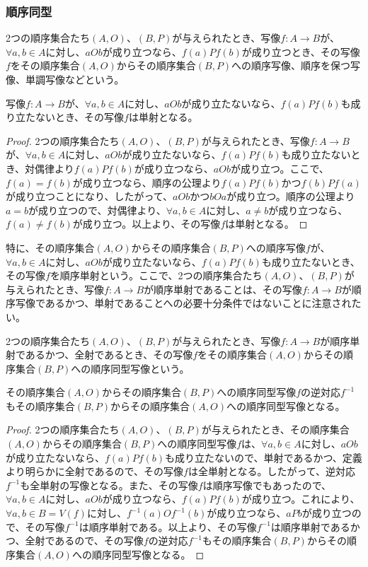 \documentclass[dvipdfmx]{jsarticle}
\begin{document}
\subsubsection{順序同型}%
\begin{dfn}
2つの順序集合たち$(A,O)$、$(B,P)$が与えられたとき、写像$f:A \rightarrow B$が、$\forall a,b \in A$に対し、$aOb$が成り立つなら、$f(a)Pf(b)$が成り立つとき、その写像$f$をその順序集合$(A,O)$からその順序集合$(B,P)$への順序写像、順序を保つ写像、単調写像などという。
\end{dfn}
\begin{thm}\label{1.3.1.11}
写像$f:A \rightarrow B$が、$\forall a,b \in A$に対し、$aOb$が成り立たないなら、$f(a)Pf(b)$も成り立たないとき、その写像$f$は単射となる。
\end{thm}
\begin{proof}
2つの順序集合たち$(A,O)$、$(B,P)$が与えられたとき、写像$f:A \rightarrow B$が、$\forall a,b \in A$に対し、$aOb$が成り立たないなら、$f(a)Pf(b)$も成り立たないとき、対偶律より$f(a)Pf(b)$が成り立つなら、$aOb$が成り立つ。ここで、$f(a) = f(b)$が成り立つなら、順序の公理より$f(a)Pf(b)$かつ$f(b)Pf(a)$が成り立つことになり、したがって、$aOb$かつ$bOa$が成り立つ。順序の公理より$a = b$が成り立つので、対偶律より、$\forall a,b \in A$に対し、$a \neq b$が成り立つなら、$f(a) \neq f(b)$が成り立つ。以上より、その写像$f$は単射となる。
\end{proof}
\begin{dfn}
特に、その順序集合$(A,O)$からその順序集合$(B,P)$への順序写像$f$が、$\forall a,b \in A$に対し、$aOb$が成り立たないなら、$f(a)Pf(b)$も成り立たないとき、その写像$f$を順序単射という。ここで、2つの順序集合たち$(A,O)$、$(B,P)$が与えられたとき、写像$f:A \rightarrow B$が順序単射であることは、その写像$f:A \rightarrow B$が順序写像であるかつ、単射であることへの必要十分条件ではないことに注意されたい。
\end{dfn}
\begin{dfn}
2つの順序集合たち$(A,O)$、$(B,P)$が与えられたとき、写像$f:A \rightarrow B$が順序単射であるかつ、全射であるとき、その写像$f$をその順序集合$(A,O)$からその順序集合$(B,P)$への順序同型写像という。
\end{dfn}
\begin{thm}\label{1.3.1.12}
その順序集合$(A,O)$からその順序集合$(B,P)$への順序同型写像$f$の逆対応$f^{- 1}$もその順序集合$(B,P)$からその順序集合$(A,O)$への順序同型写像となる。
\end{thm}
\begin{proof}
2つの順序集合たち$(A,O)$、$(B,P)$が与えられたとき、その順序集合$(A,O)$からその順序集合$(B,P)$への順序同型写像$f$は、$\forall a,b \in A$に対し、$aOb$が成り立たないなら、$f(a)Pf(b)$も成り立たないので、単射であるかつ、定義より明らかに全射であるので、その写像$f$は全単射となる。したがって、逆対応$f^{- 1}$も全単射の写像となる。また、その写像$f$は順序写像でもあったので、$\forall a,b \in A$に対し、$aOb$が成り立つなら、$f(a)Pf(b)$が成り立つ。これにより、$\forall a,b \in B = V(f)$に対し、$f^{- 1}(a)Of^{- 1}(b)$が成り立つなら、$aPb$が成り立つので、その写像$f^{- 1}$は順序単射である。以上より、その写像$f^{- 1}$は順序単射であるかつ、全射であるので、その写像$f$の逆対応$f^{- 1}$もその順序集合$(B,P)$からその順序集合$(A,O)$への順序同型写像となる。
\end{proof}
\end{document}
